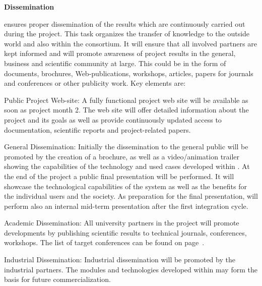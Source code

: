 {\begin{tasks}{\WPInnovationNo}
\item {\bf Dissemination}
\label{task:wpinnovation:dissemination}

\WPInnovation{} ensures proper dissemination of the \Project{} results which are continuously carried out during the \Project{} project. This task organizes the transfer of knowledge to the outside world and also within the consortium. It will ensure that all involved partners are kept informed and will promote awareness of project results in the general, business and scientific community at large. This could be in the form of documents, brochures, Web-publications, workshops, articles, papers for journals and conferences or other publicity work. Key elements are:
\begin{denseItemize}
\item Public Project Web-site: A fully functional project web site will be available as soon as project month 2. The web site will offer detailed information about the project and its goals as well as provide continuously updated access to documentation, scientific reports and project-related papers.


\item General Dissemination: Initially the dissemination to the general public will be promoted by the creation of a brochure, as well as a video/animation trailer showing the capabilities of the technology and used cases developed within \Project{}. At the end of the project a public final presentation will be performed. It will showcase the technological capabilities of the system as well as the benefits for the individual users and the society. As preparation for the final presentation, \Project{} will perform also an internal mid-term presentation after the first integration cycle.

\item Academic Dissemination: All university partners in the project will promote \Project{} developments by publishing scientific results to technical journals, conferences, workshops. The list of target conferences can be found on page~\pageref{sec:diss}.

\item Industrial Dissemination: Industrial dissemination will be promoted by the industrial partners. The modules and technologies developed within \Project{} may form the basis for future commercialization.
\end{denseItemize}


\end{tasks}}
